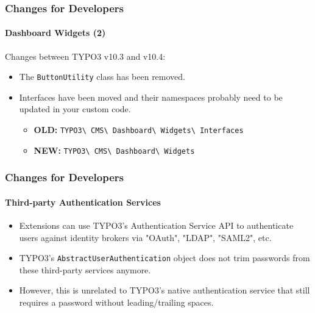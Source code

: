 \begin{frame}[fragile]
	\frametitle{Changes for Developers}
	\framesubtitle{Dashboard Widgets (2)}

	Changes between TYPO3 v10.3 and v10.4:

	\begin{itemize}
		\item The \texttt{ButtonUtility} class has been removed.
		\item Interfaces have been moved and their namespaces probably need to
			be updated in your custom code.
			\begin{itemize}\smaller
				\item \textbf{OLD:}
					\texttt{TYPO3\textbackslash
						CMS\textbackslash
						Dashboard\textbackslash
						Widgets\textbackslash
						Interfaces}
				\item \textbf{NEW:}
					\texttt{TYPO3\textbackslash
						CMS\textbackslash
						Dashboard\textbackslash
						Widgets}
			\end{itemize}\normalsize
	\end{itemize}

\end{frame}


\begin{frame}[fragile]
	\frametitle{Changes for Developers}
	\framesubtitle{Third-party Authentication Services}

	\begin{itemize}

		\item Extensions can use TYPO3's Authentication Service API to authenticate
			users against identity brokers via "OAuth", "LDAP", "SAML2", etc.
		\item TYPO3's \texttt{AbstractUserAuthentication} object does not trim passwords
			from these third-party services anymore.
		\item However, this is unrelated to TYPO3's native authentication service
			that still requires a password without leading/trailing spaces.

	\end{itemize}

\end{frame}


